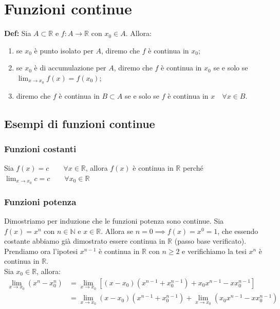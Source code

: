 \documentclass{article}
\begin{document}
\section{Funzioni continue}
\textbf{Def:} Sia $A \subset \mathbb{R}$ e $f: A \xrightarrow{} \mathbb{R}$ con $x_0 \in A$. Allora:
\begin{enumerate}
    \item se $x_0$ è punto isolato per $A$, diremo che $f$ è continua in $x_0$;
    \item se $x_0$ è di accumulazione per $A$, diremo che $f$ è continua in $x_0$ se e solo se $\lim_{x \to x_0} f(x) = f(x_0)$;
    \item diremo che $f$ è continua in $B \subset A$ se e solo se $f$ è continua in $x \quad \forall x \in B$.
\end{enumerate}

\subsection{Esempi di funzioni continue}
\subsubsection{Funzioni costanti}
Sia $f(x) = c \qquad \forall x \in \mathbb{R}$, allora $f(x)$ è continua in $\mathbb{R}$ perché $\lim_{x \to x_0} c = c \qquad \forall x_0 \in \mathbb{R}$

\subsubsection{Funzioni potenza}
Dimostriamo per induzione che le funzioni potenza sono continue. Sia $f(x) = x^n$ con $n \in \mathbb{N}$ e $x \in \mathbb{R}$. Allora se $n = 0 \implies f(x) = x^0 = 1$, che essendo costante abbiamo già dimostrato essere continua in $\mathbb{R}$ (passo base verificato).\\
Prendiamo ora l'ipotesi $x^{n - 1}$ è continua in $\mathbb{R}$ con $n \geq 2$ e verifichiamo la tesi $x^n$ è continua in $\mathbb{R}$. \\
Sia $x_0 \in \mathbb{R}$, allora:
\begin{align*}
    \lim_{x \to x_0} (x^n - x_0^n) &= \lim_{x \to x_0} [(x - x_0)(x^{n-1} + x_0^{n-1}) + x_0x^{n - 1} - xx_0^{n - 1}]\\
    &= \lim_{x \to x_0} (x - x_0)(x^{n - 1} + x_0^{n - 1}) + \lim_{x \to x_0} (x_0x^{n - 1} - xx_0^{n - 1})
\end{align*}
\end{document}
